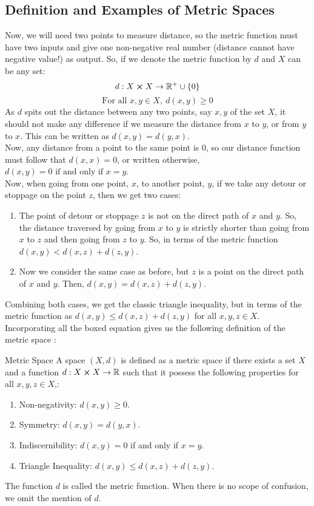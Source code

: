 \subsection{Definition and Examples of Metric Spaces}
Now, we will need two points to measure distance, so the metric function must have two inputs and give one non-negative real number (distance cannot have negative value!) as output. So, if we denote the metric function by $d$ and $X$ can be any set: $$d:X\cross X\to \mathbb{R}^+\cup\{0\}$$ $$\text{For all }x,y\in X,\ \boxed{d(x,y)\geq 0}$$
As $d$ spits out the distance between any two points, say $x,y$ of the set $X$, it should not make any difference if we measure the distance from $x$ to $y$, or from $y$ to $x$. This can be written as $\boxed{d(x,y)=d(y,x)}$.\\
Now, any distance from a point to the same point is $0$, so our distance function must follow that $d(x,x)=0$, or written otherwise, $\boxed{d(x,y)=0\text{ if and only if } x=y}$.\\
Now, when going from one point, $x$, to another point, $y$, if we take any detour or stoppage on the point $z$, then we get two cases:
\begin{enumerate}
	\item The point of detour or stoppage $z$ is not on the direct path of $x$ and $y$. So, the distance traversed by going from $x$ to $y$ is strictly shorter than going from $x$ to $z$ and then going from $z$ to $y$. So, in terms of the metric function $d(x,y)<d(x,z)+d(z,y)$.
	\item Now we consider the same case as before, but $z$ is a point on the direct path of $x$ and $y$. Then, $d(x,y)=d(x,z)+d(z,y)$.
\end{enumerate}
Combining both cases, we get the classic triangle inequality, but in terms of the metric function as $\boxed{d(x,y)\leq d(x,z)+d(z,y)}$ for all $x,y,z\in X$.\\
Incorporating all the boxed equation gives us the following definition of the metric space :
\begin{Definition}{Metric Space}\label{metric_space}
	A space $(X,d)$ is defined as a metric space if there exists a set $X$ and a function $d:X\cross X\to \mathbb{R}$ such that it possess the following properties for all $x,y,z\in X$,:
	\begin{enumerate}
		\item Non-negativity: $d(x,y)\geq0$.
		\item Symmetry: $d(x,y)=d(y,x)$.
		\item Indiscernibility: $d(x,y)=0$ if and only if $x=y$.
		\item Triangle Inequality: $d(x,y)\leq d(x,z)+d(z,y)$.
	\end{enumerate}
	The function $d$ is called the metric function. When there is no scope of confusion, we omit the mention of $d$.
\end{Definition}
